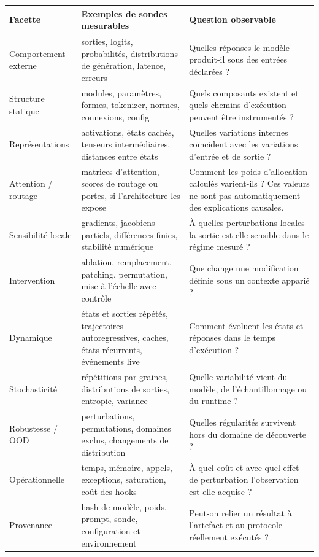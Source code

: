 \documentclass[11pt,oneside]{book}
\theoremstyle{definition}
\theoremstyle{remark}
\newcommand{\1}{\mathbf 1}
\begin{document}
\begin{longtable}{p{}p{}p{}}
\toprule
\textbf{Facette} & \textbf{Exemples de sondes mesurables} & \textbf{Question observable}\\
\midrule
\endhead
Comportement externe & sorties, logits, probabilités, distributions de génération, latence, erreurs & Quelles réponses le modèle produit-il sous des entrées déclarées ?\\
Structure statique & modules, paramètres, formes, tokenizer, normes, connexions, config & Quels composants existent et quels chemins d'exécution peuvent être instrumentés ?\\
Représentations & activations, états cachés, tenseurs intermédiaires, distances entre états & Quelles variations internes coïncident avec les variations d'entrée et de sortie ?\\
Attention / routage & matrices d'attention, scores de routage ou portes, si l'architecture les expose & Comment les poids d'allocation calculés varient-ils ? Ces valeurs ne sont pas automatiquement des explications causales.\\
Sensibilité locale & gradients, jacobiens partiels, différences finies, stabilité numérique & À quelles perturbations locales la sortie est-elle sensible dans le régime mesuré ?\\
Intervention & ablation, remplacement, patching, permutation, mise à l'échelle avec contrôle & Que change une modification définie sous un contexte apparié ?\\
Dynamique & états et sorties répétés, trajectoires autoregressives, caches, états récurrents, événements live & Comment évoluent les états et réponses dans le temps d'exécution ?\\
Stochasticité & répétitions par graines, distributions de sorties, entropie, variance & Quelle variabilité vient du modèle, de l'échantillonnage ou du runtime ?\\
Robustesse / OOD & perturbations, permutations, domaines exclus, changements de distribution & Quelles régularités survivent hors du domaine de découverte ?\\
Opérationnelle & temps, mémoire, appels, exceptions, saturation, coût des hooks & À quel coût et avec quel effet de perturbation l'observation est-elle acquise ?\\
Provenance & hash de modèle, poids, prompt, sonde, configuration et environnement & Peut-on relier un résultat à l'artefact et au protocole réellement exécutés ?\\
\bottomrule
\end{longtable}
\end{document}
